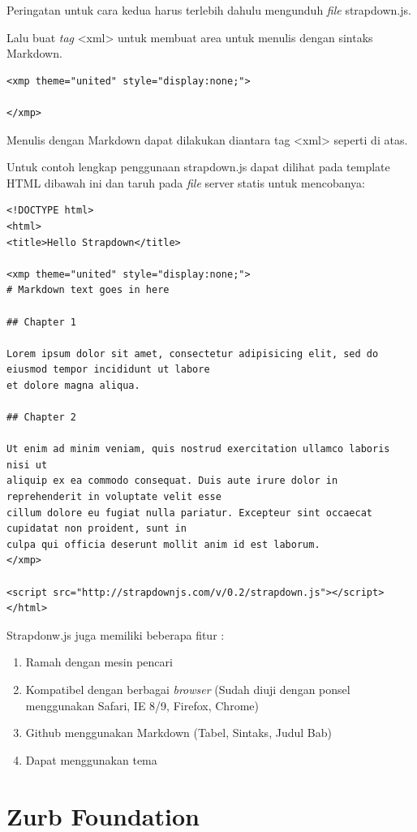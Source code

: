 Peringatan untuk cara kedua harus terlebih dahulu mengunduh {\it file} strapdown.js.

Lalu buat {\it tag} <xml> untuk membuat area untuk menulis dengan sintaks
Markdown.
\begin{lstlisting}
<xmp theme="united" style="display:none;">

</xmp>
\end{lstlisting}
Menulis dengan Markdown dapat dilakukan diantara  tag <xml> seperti di atas.

Untuk contoh lengkap penggunaan strapdown.js dapat dilihat pada template HTML
dibawah ini dan taruh pada {\it file} server statis untuk mencobanya:
\begin{lstlisting}
<!DOCTYPE html>
<html>
<title>Hello Strapdown</title>

<xmp theme="united" style="display:none;">
# Markdown text goes in here

## Chapter 1

Lorem ipsum dolor sit amet, consectetur adipisicing elit, sed do eiusmod tempor incididunt ut labore
et dolore magna aliqua. 

## Chapter 2

Ut enim ad minim veniam, quis nostrud exercitation ullamco laboris nisi ut
aliquip ex ea commodo consequat. Duis aute irure dolor in reprehenderit in voluptate velit esse
cillum dolore eu fugiat nulla pariatur. Excepteur sint occaecat cupidatat non proident, sunt in
culpa qui officia deserunt mollit anim id est laborum.
</xmp>

<script src="http://strapdownjs.com/v/0.2/strapdown.js"></script>
</html>
\end{lstlisting}

Strapdonw.js juga memiliki beberapa fitur :
\begin{enumerate}[(1)]
\item Ramah dengan mesin pencari
\item Kompatibel dengan berbagai {\it browser} (Sudah diuji dengan ponsel menggunakan
Safari, IE 8/9, Firefox, Chrome)
\item Github menggunakan Markdown (Tabel, Sintaks, Judul Bab)
\item Dapat menggunakan tema
\end{enumerate}

\section{Zurb Foundation \cite{Zurb:2015}}
\label{sec:zurbfoundation}

